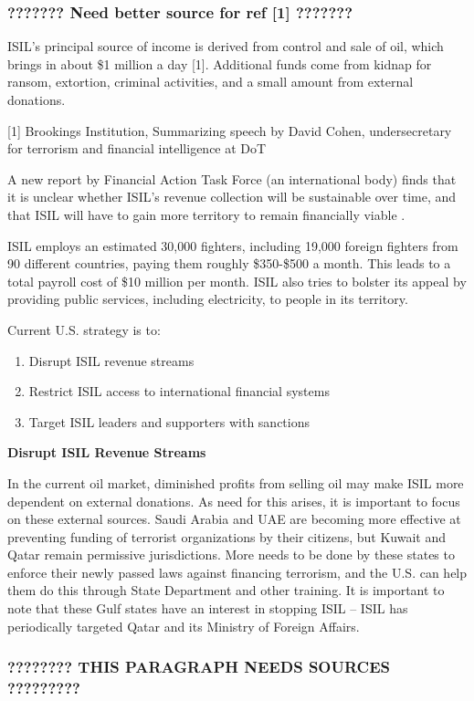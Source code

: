 \documentclass{report}
\begin{document}
\subsubsection{???????  Need better source for ref [1]    ???????}

ISIL's principal source of income is derived from control and sale of oil, which brings in about \$1 million a day [1]. Additional funds come from kidnap for ransom, extortion, criminal activities, and a small amount from external donations. 

[1]  Brookings Institution, Summarizing speech by David Cohen, undersecretary for terrorism and financial intelligence at DoT

A new report by Financial Action Task Force (an international body) finds that it is unclear whether ISIL's revenue collection will be sustainable over time, and that ISIL will have to gain more territory to remain financially viable \cite{TheEditorialBoard2015,Report2015}.

ISIL employs an estimated 30,000 fighters, including 19,000 foreign fighters from 90 different countries, paying them roughly \$350-\$500 a month. This leads to a total payroll cost of \$10 million per month. ISIL also tries to bolster its appeal by providing public services, including electricity, to people in its territory. 

Current U.S. strategy is to:

\begin{enumerate}
  \item Disrupt ISIL revenue streams
  \item Restrict ISIL access to international financial systems
  \item Target ISIL leaders and supporters with sanctions
\end{enumerate}



\textbf{Disrupt ISIL Revenue Streams}

In the current oil market, diminished profits from selling oil may make ISIL more dependent on external donations. As need for this arises, it is important to focus on these external sources. Saudi Arabia and UAE are becoming more effective at preventing funding of terrorist organizations by their citizens, but Kuwait and Qatar remain permissive jurisdictions. More needs to be done by these states to enforce their newly passed laws against financing terrorism, and the U.S. can help them do this through State Department and other training. It is important to note that these Gulf states have an interest in stopping ISIL – ISIL has periodically targeted Qatar and its Ministry of Foreign Affairs. \subsubsection{???????? THIS PARAGRAPH NEEDS SOURCES   ?????????} 
\end{document}
